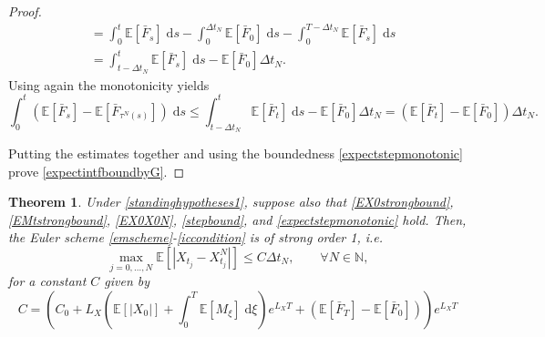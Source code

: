 \documentclass[reqno,12pt]{amsart}
\theoremstyle{plain}%
\newtheorem{thm}{Theorem}[section]
\theoremstyle{definition}
\begin{document}
\begin{proof}
\begin{align*}
        & = \int_0^t \mathbb{E}[\bar F_s] \;\mathrm{d}s - \int_0^{\Delta t_N} \mathbb{E}[\bar F_0]\;\mathrm{d}s - \int_{0}^{T-\Delta t_N} \mathbb{E}[\bar F_s]\;\mathrm{d}s \\
        & = \int_{t-\Delta t_N}^t \mathbb{E}[\bar F_s] \;\mathrm{d}s - \mathbb{E}[\bar F_0]\Delta t_N.
    \end{align*}
    Using again the monotonicity yields
    \[ 
      \int_0^t (\mathbb{E}[\bar F_s] - \mathbb{E}[\bar F_{\tau^N(s)}])\;\mathrm{d}s \leq \int_{t-\Delta t_N}^t \mathbb{E}[\bar F_t] \;\mathrm{d}s - \mathbb{E}[\bar F_0]\Delta t_N= (\mathbb{E}[\bar F_t] - \mathbb{E}[\bar F_0])\Delta t_N.
    \]

    Putting the estimates together and using the boundedness \eqref{expectstepmonotonic} prove \eqref{expectintfboundbyG}.
\end{proof}

\begin{thm}
    \label{thmmonotonicbound}
    Under \cref{standinghypotheses1}, suppose also that
    \eqref{EX0strongbound}, \eqref{EMtstrongbound}, \eqref{EX0X0N}, \eqref{stepbound}, and \eqref{expectstepmonotonic} hold. Then, the Euler scheme \eqref{emscheme}-\eqref{iccondition} is of strong order 1, i.e.
    \begin{equation}
      \label{thmmonotonicboundstrongordernew}
        \max_{j=0, \ldots, N}\mathbb{E}\left[ \left| X_{t_j} - X_{t_j}^N \right| \right] \leq C \Delta t_N, \qquad \forall N \in \mathbb{N},
    \end{equation}
    for a constant $C$ given by
    \begin{equation}
        \label{constmonotonicboundstrongordernew}
        C = \left(C_0 + L_X \left(\mathbb{E}[|X_0|] + \int_0^{T} \mathbb{E}[M_\xi]\;\mathrm{d}\xi\right)e^{L_X T} + (\mathbb{E}[\bar F_T] - \mathbb{E}[\bar F_0])\right)e^{L_X T}
    \end{equation}
\end{thm}
\end{document}
